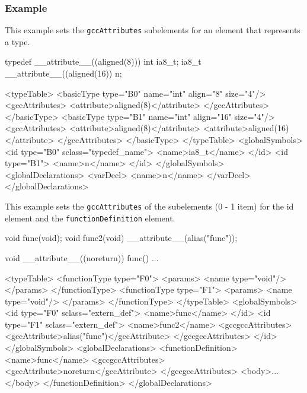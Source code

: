 {\subsubsection*{Example}

This example sets the {\tt gccAttributes} subelements for an element that represents a type.
\vspace{2mm}

\begin{CExample}
  typedef __attribute__((aligned(8))) int ia8_t;
  ia8_t __attribute__((aligned(16)) n;
\end{CExample}
\vspace{1mm}

\begin{XcodeMLExample}
 <typeTable>
    <basicType type="B0" name="int" align="8" size="4"/>
      <gccAttributes>
        <attribute>aligned(8)</attribute>
     </gccAttributes>
    </basicType>
    <basicType type="B1" name="int" align="16" size="4"/>
     <gccAttributes>
        <attribute>aligned(8)</attribute>
        <attribute>aligned(16)</attribute>
      </gccAttributes>
   </basicType>
  </typeTable>
 <globalSymbols>
   <id type="B0" sclass="typedef_name">
      <name>ia8_t</name>
    </id>
   <id type="B1">
      <name>n</name>
    </id>
  </globalSymbols>
 <globalDeclarations>
    <varDecl>
      <name>n</name>
    </varDecl>
  </globalDeclarations>
\end{XcodeMLExample}

This example sets the {\tt gccAttributes} of the subelements (0 - 1 item) for the id element and the {\tt functionDefinition} element.
\vspace{2mm} 

\begin{CExample}
 void func(void);
 void func2(void) __attribute__(alias("func")); 
  
  void __attribute__((noreturn)) func() {
     ...
  }
\end{CExample}
\vspace{1mm} 
 
\begin{XcodeMLExample}
 <typeTable>
   <functionType type="F0">
     <params>
        <name type="void"/>
      </params>
    </functionType>
    <functionType type="F1">
      <params>
        <name type="void"/>
      </params>
    </functionType>
  </typeTable>
  <globalSymbols>
    <id type="F0" sclass="extern_def">
      <name>func</name>
    </id>
    <id type="F1" sclass="extern_def">
      <name>func2</name>
      <gccgccAttributes>
        <gccAttribute>alias("func")</gccAttribute>
      </gccgccAttributes>
    </id>
  </globalSymbols>
  <globalDeclarations>
    <functionDefinition>
      <name>func</name>
      <gccgccAttributes>
        <gccAttribute>noreturn</gccAttribute>
      </gccgccAttributes>
      <body>...</body>
    </functionDefinition>
  </globalDeclarations>
\end{XcodeMLExample}


}
